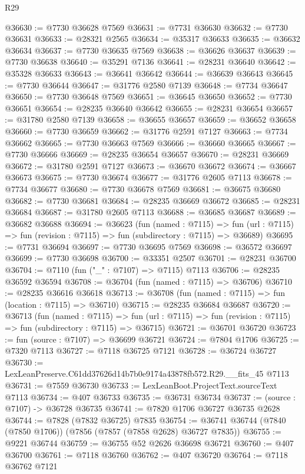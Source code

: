\begin{lexlean}{R29}
\begin{coremodule}
@36630 := @7730 @36628 @7569
@36631 := @7731 @36630
@36632 := @7730 @36631
@36633 := @28321 @2565
@36634 := @35317 @36633
@36635 := @36632 @36634
@36637 := @7730 @36635 @7569
@36638 := @36626 @36637
@36639 := @7730 @36638
@36640 := @35291 @7136
@36641 := @28231 @36640
@36642 := @35328 @36633
@36643 := @36641 @36642
@36644 := @36639 @36643
@36645 := @7730 @36644
@36647 := @31776 @2580 @7139
@36648 := @7734 @36647
@36650 := @7730 @36648 @7569
@36651 := @36645 @36650
@36652 := @7730 @36651
@36654 := @28235 @36640 @36642
@36655 := @28231 @36654
@36657 := @31780 @2580 @7139
@36658 := @36655 @36657
@36659 := @36652 @36658
@36660 := @7730 @36659
@36662 := @31776 @2591 @7127
@36663 := @7734 @36662
@36665 := @7730 @36663 @7569
@36666 := @36660 @36665
@36667 := @7730 @36666
@36669 := @28235 @36654 @36657
@36670 := @28231 @36669
@36672 := @31780 @2591 @7127
@36673 := @36670 @36672
@36674 := @36667 @36673
@36675 := @7730 @36674
@36677 := @31776 @2605 @7113
@36678 := @7734 @36677
@36680 := @7730 @36678 @7569
@36681 := @36675 @36680
@36682 := @7730 @36681
@36684 := @28235 @36669 @36672
@36685 := @28231 @36684
@36687 := @31780 @2605 @7113
@36688 := @36685 @36687
@36689 := @36682 @36688
@36694 := @36623
    (fun (named : @7115) =>
    fun (url : @7115) => fun (revision : @7115) => fun (subdirectory : @7115) => @36689)
@36695 := @7731 @36694
@36697 := @7730 @36695 @7569
@36698 := @36572 @36697
@36699 := @7730 @36698
@36700 := @33351 @2507
@36701 := @28231 @36700
@36704 := @7110 (fun ("_" : @7107) => @7115) @7113
@36706 := @28235 @36592 @36594
@36708 := @36704 (fun (named : @7115) => @36706)
@36710 := @28235 @36616 @36618
@36713 := @36708 (fun (named : @7115) => fun (location : @7115) => @36710)
@36715 := @28235 @36684 @36687
@36720 := @36713
    (fun (named : @7115) =>
    fun (url : @7115) => fun (revision : @7115) => fun (subdirectory : @7115) => @36715)
@36721 := @36701 @36720
@36723 := fun (source : @7107) => @36699 @36721
@36724 := @7804 @1706
@36725 := @7320 @7113
@36727 := @7118 @36725 @7121
@36728 := @36724 @36727
@36730 := LexLeanPreserve.C61dd37626d14b7b0e9174a43878fb572.R29.__fits_45 @7113
@36731 := @7559 @36730
@36733 := LexLeanBoot.ProjectText.sourceText @7113
@36734 := @407 @36733
@36735 := @36731 @36734
@36737 := (source : @7107) -> @36728 @36735
@36741 := @7820 @1706 @36727 @36735 @2628
@36744 := @7828 (@7832 @36725) @7835
@36754 := @36741 @36744 (@7840 (@7850 @1706)) (@7856 (@7857 (@7858 @2628) @36727 @7835))
@36755 := @9221 @36744
@36759 := @36755 @52 @2626 @36698 @36721
@36760 := @407 @36700
@36761 := @7118 @36760
@36762 := @407 @36720
@36764 := @7118 @36762 @7121

\end{coremodule}
\end{lexlean}
